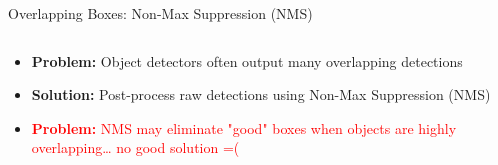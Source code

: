 \documentclass[10pt]{beamer}
\theoremstyle{remark}
\theoremstyle{definition}
\begin{document}
\begin{frame}{Overlapping Boxes: Non-Max Suppression (NMS)}
\begin{columns}
    \begin{column}{0.5\textwidth}
    \begin{itemize}
        \item<1-> \textbf{Problem:} Object detectors often output many overlapping detections
        \item<2-> \textbf{Solution:} Post-process raw detections using Non-Max Suppression (NMS)
        \item<5-> \textcolor{red}{\textbf{Problem:} NMS may eliminate "good" boxes when objects are highly overlapping… no good solution =( }
    \end{itemize}
    \end{column}
    
    \begin{column}{0.5\textwidth}


\end{column}
\end{columns}
\end{frame}
\end{document}
